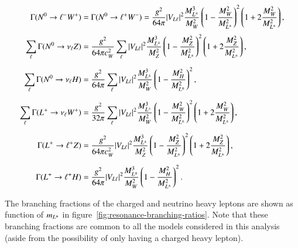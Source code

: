 %
\begin{align}
\label{eq:Gammatr0W}
\Gamma(\lzero \to \ell^- W^+) &=  \Gamma(\lzero \to \ell^+ W^-) =
\frac{g^2}{64 \pi} |V_{L\ell}|^2
\frac{M_{\lpm}^3}{M_W^2} \left( 1- \frac{M_W^2}{M_{\lpm}^2} \right)^2 
\left( 1 + 2 \frac{M_W^2}{M_{\lpm}^2} \right) , 
\\[0.1cm]
\label{eq:Gammatr0Z}
\sum_{\ell}\Gamma(\lzero \to \nu_{\ell} Z) &=  \frac{g^2}{64 \pi c_W^2} 
\sum_\ell |V_{L\ell}|^2
\frac{M_{\lpm}^3}{M_Z^2} \left( 1- \frac{M_Z^2}{M_{\lpm}^2} \right)^2 
\left( 1 + 2 \frac{M_Z^2}{M_{\lpm}^2}\right),
\\[0.2cm]
\label{eq:Gammatr0h}
\sum_{\ell}\Gamma(\lzero \to \nu_{\ell} H) &=  \frac{g^2}{64 \pi} 
\sum_\ell |V_{L\ell}|^2
\frac{M_{\lpm}^3}{M_W^2} \left( 1- \frac{M_H^2}{M_{\lpm}^2} \right)^2 ,
\\[0.2cm]
\label{eq:Gammatr+W}
\sum_{\ell}\Gamma(\lplus \to \nu_{\ell} W^+) &= 
\frac{g^2}{32 \pi} \sum_\ell |V_{L\ell}|^2
\frac{M_{\lpm}^3}{M_W^2} \left( 1- \frac{M_W^2}{M_{\lpm}^2} \right)^2 
\left( 1 + 2 \frac{M_W^2}{M_{\lpm}^2} \right) ,
\\[0.2cm]
\label{eq:Gammatr+Z}
\Gamma(\lplus \to \ell^+ Z) &= 
\frac{g^2}{64 \pi c_W^2} |V_{L\ell}|^2
\frac{M_{\lpm}^3}{M_Z^2} \left( 1- \frac{M_Z^2}{M_{\lpm}^2} \right)^2 
\left( 1 + 2 \frac{M_Z^2}{M_{\lpm}^2}\right),
\\[0.2cm]
\label{eq:Gammatr+h}
\Gamma(\lplus \to \ell^+ H) &= \frac{g^2}{64 \pi} |V_{L\ell}|^2
\frac{M_{\lpm}^3}{M_W^2} \left( 1- \frac{M_H^2}{M_{\lpm}^2} \right)^2 .
\end{align}

The branching fractions of the charged and neutrino heavy leptons are shown as function of $m_{L^{\pm}}$ in figure~\ref{fig:resonance-branching-ratios}. Note that these branching fractions are common to all the models considered in this analysis (aside from the possibility of only having a charged heavy lepton).


